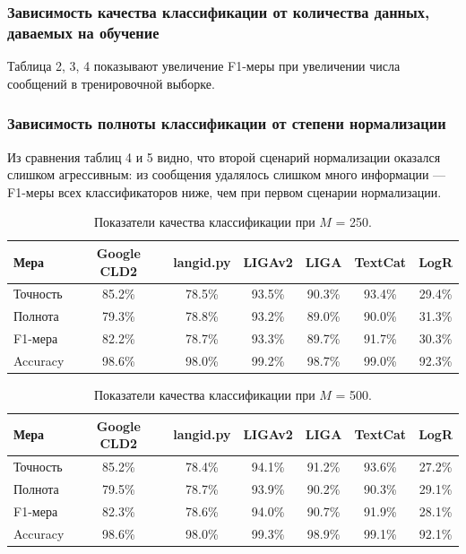 \documentclass[a4paper, 14pt]{article}
\begin{document}
		\subsubsection{Зависимость качества классификации от количества данных, даваемых на обучение}
		Таблица 2, 3, 4 показывают увеличение F1-меры при увеличении числа сообщений в тренировочной выборке.
		
		\subsubsection{Зависимость полноты классификации от степени нормализации}
		Из сравнения таблиц 4 и 5 видно, что второй сценарий нормализации оказался слишком агрессивным: из сообщения удалялось слишком много информации --- F1-меры всех классификаторов ниже, чем при первом сценарии нормализации. 


\begin{center}
\begin{table}
\begin{tabular*}{0.954\textwidth}{| l| *{6}{|c} |}
\hline 
Мера & Google CLD2 & langid.py & LIGAv2 & LIGA & TextCat  & LogR\\
\hline
Точность & 85.2\% & 78.5\% & 93.5\% & 90.3\% & 93.4\% & 29.4\%\\
Полнота & 79.3\% & 78.8\% & 93.2\% & 89.0\% & 90.0\% & 31.3\%\\
F1-мера & 82.2\% & 78.7\% & 93.3\% & 89.7\% & 91.7\% & 30.3\%\\
Accuracy & 98.6\% & 98.0\% & 99.2\% & 98.7\% & 99.0\% & 92.3\%\\
\hline
\end{tabular*}
\caption{Показатели качества классификации при $M$ = 250.}
\end{table}
\end{center}

\begin{center}
\begin{table}
\begin{tabular*}{0.954\textwidth}{| l| *{6}{|c} |}
\hline 
Мера & Google CLD2 & langid.py & LIGAv2 & LIGA & TextCat  & LogR\\
\hline
Точность & 85.2\% & 78.4\% & 94.1\% & 91.2\% & 93.6\% & 27.2\%\\
Полнота & 79.5\% & 78.7\% & 93.9\% & 90.2\% & 90.3\% & 29.1\%\\
F1-мера & 82.3\% & 78.6\% & 94.0\% & 90.7\% & 91.9\% & 28.1\%\\
Accuracy & 98.6\% & 98.0\% & 99.3\% & 98.9\% & 99.1\% & 92.1\%\\
\hline
\end{tabular*}
\caption{Показатели качества классификации при $M$ = 500.}
\end{table}
\end{center}
\end{document}
